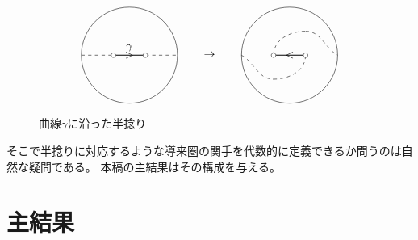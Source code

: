 \documentclass[uplatex,a4paper,dvipdfmx]{jsarticle}
\theoremstyle{plain}
\theoremstyle{definition}
\begin{document}
\begin{figure}[h]\label{fig:half_twist}
	\begin{displaymath}
		\begin{tikzpicture}
			\draw (0, 1.5) circle[radius=1.5];
			\draw[thick] (-0.5, 1.5)--(0.5, 1.5);
			\draw(0, 1.5) node{$>$};
			\draw[dashed] (-1.5, 1.5)--(-0.5, 1.5);
			\draw[dashed] (0.5, 1.5)--(1.5, 1.5);

			\foreach \u in {-0.5, 0.5}
				{
					\filldraw[white] (\u, 1.5) circle (2pt);
					\draw[black] (\u, 1.5) circle (2pt);
				}
			\draw(0, 1.5) node[above]{$\gamma$};

			\draw(2.5, 1.5) node{$\rightarrow$};

			\draw (0+5, 1.5) circle[radius=1.5];
			\draw[thick] (-0.5+5, 1.5)--(0.5+5, 1.5);
			\draw(5, 1.5) node{$<$};


			\draw[dashed](-1.5+5, 1.5) to[out=-30,in=180](-0.5+5, 0.75);
			\draw[dashed](-0.5+5, 0.75) to[out=0,in=-90](0.5+5, 1.5);

			\draw[dashed](-0.5+5, 1.5) to[out=90,in=180](0.5+5, 2.25);
			\draw[dashed](0.5+5, 2.25) to[out=0,in=150](1.5+5, 1.5);


			\foreach \u in {-0.5, 0.5}
				{
					\filldraw[white] (\u+5, 1.5) circle (2pt);
					\draw[black] (\u+5, 1.5) circle (2pt);
				}
		\end{tikzpicture}
	\end{displaymath}
	\caption{曲線$\gamma$に沿った半捻り}
\end{figure}
そこで半捻りに対応するような導来圏の関手を代数的に定義できるか問うのは自然な疑問である。
本稿の主結果はその構成を与える。
\section{主結果}
\end{document}
